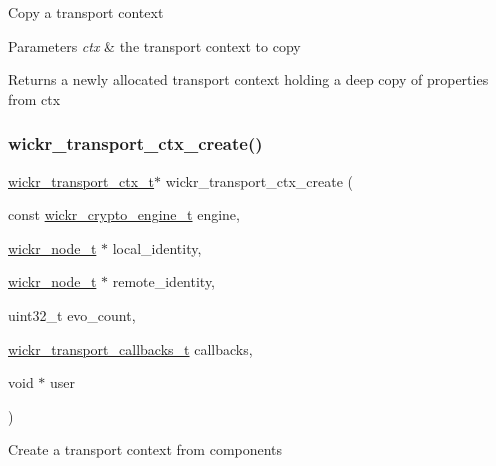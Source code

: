 Copy a transport context


\begin{DoxyParams}{Parameters}
{\em ctx} & the transport context to copy \\
\hline
\end{DoxyParams}
\begin{DoxyReturn}{Returns}
a newly allocated transport context holding a deep copy of properties from \textquotesingle{}ctx\textquotesingle{} 
\end{DoxyReturn}
\mbox{\label{group__wickr__transport__ctx_ga4731758cf20b71d4469c74904bf662c0}} 
\subsubsection{\texorpdfstring{wickr\_transport\_ctx\_create()}{wickr\_transport\_ctx\_create()}}
{\footnotesize\ttfamily \mbox{\hyperlink{structwickr__transport__ctx}{wickr\+\_\+transport\+\_\+ctx\+\_\+t}}$\ast$ wickr\+\_\+transport\+\_\+ctx\+\_\+create (\begin{DoxyParamCaption}\item[{const \mbox{\hyperlink{structwickr__crypto__engine}{wickr\+\_\+crypto\+\_\+engine\+\_\+t}}}]{engine,  }\item[{\mbox{\hyperlink{structwickr__node}{wickr\+\_\+node\+\_\+t}} $\ast$}]{local\+\_\+identity,  }\item[{\mbox{\hyperlink{structwickr__node}{wickr\+\_\+node\+\_\+t}} $\ast$}]{remote\+\_\+identity,  }\item[{uint32\+\_\+t}]{evo\+\_\+count,  }\item[{\mbox{\hyperlink{structwickr__transport__callbacks}{wickr\+\_\+transport\+\_\+callbacks\+\_\+t}}}]{callbacks,  }\item[{void $\ast$}]{user }\end{DoxyParamCaption})}

Create a transport context from components


